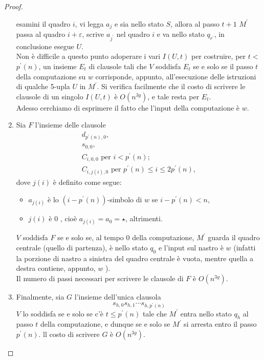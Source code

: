 \begin{proof}
\begin{enumerate}
              esamini il quadro $i$, vi legga $a_j$ e sia nello stato $S$,
              allora al passo $t+1$ $M^{\prime}$ passa al quadro
              $i+\varepsilon$, scrive $a_{j^{\prime}}$ nel quadro $i$ e va nello
              stato $q_{r^{\prime}}$, in conclusione esegue $U$.\\
              Non è difficile a questo punto adoperare i vari $I(U, t)$ per
              costruire, per $t<$ $p^{\prime}(n)$, un insieme $E_t$ di clausole
              tali che $V$ soddisfa $E_t$ se e solo se il passo $t$ della
              computazione su $w$ corrisponde, appunto, all'esecuzione delle
              istruzioni di qualche 5-upla $U$ in $M^{\prime}$. Si verifica
              facilmente che il costo di scrivere le clausole di un singolo
              $I(U, t)$ è $O\left(n^{3 g}\right)$, e tale resta per $E_t$.\\

              Adesso cerchiamo di esprimere il fatto che l'input della
              computazione è $w$.
        \item Sia $F$ l'insieme delle clausole
              $$
                  \begin{gathered}
                      d_{p^{\prime}(n), 0}, \\
                      s_{0,0}, \\
                      C_{i, 0,0} \text { per } i<p^{\prime}(n) ; \\
                      C_{i, j(i), 0} \text { per } p^{\prime}(n) \leq i \leq 2 p^{\prime}(n),
                  \end{gathered}
              $$
              dove $j(i)$ è definito come segue:
              \begin{itemize}
                  \item $a_{j(i)}$ è lo $\left(i-p^{\prime}(n)\right)$-simbolo
                        di $w$ se $i-p^{\prime}(n)<n$,
                  \item $j(i)$ è 0 , cioè $a_{j(i)}=a_0=\star$, altrimenti.
              \end{itemize}
              $V$ soddisfa $F$ se e solo se, al tempo 0 della computazione,
              $M^{\prime}$ guarda il quadro centrale (quello di partenza), è
              nello stato $q_0$ e l'input sul nastro è $w$ (infatti la porzione
              di nastro a sinistra del quadro centrale è vuota, mentre quella a
              destra contiene, appunto, $w$ ).\\
              Il numero di passi necessari per scrivere le clausole di $F$ è
              $O\left(n^{3 g}\right)$.
        \item Finalmente, sia $G$ l'insieme dell'unica clausola
              $$
                  s_{h, 0} s_{h, 1} \cdots s_{h, p^{\prime}(n)}
              $$
              $V$ lo soddisfa se e solo se c'è $t \leq p^{\prime}(n)$ tale che
              $M^{\prime}$ entra nello stato $q_h$ al passo $t$ della
              computazione, e dunque se e solo se $M^{\prime}$ si arresta entro
              il passo $p^{\prime}(n)$. ll costo di scrivere $G$ è $O\left(n^{3
                      g}\right)$.
    \end{enumerate}


\end{proof}
